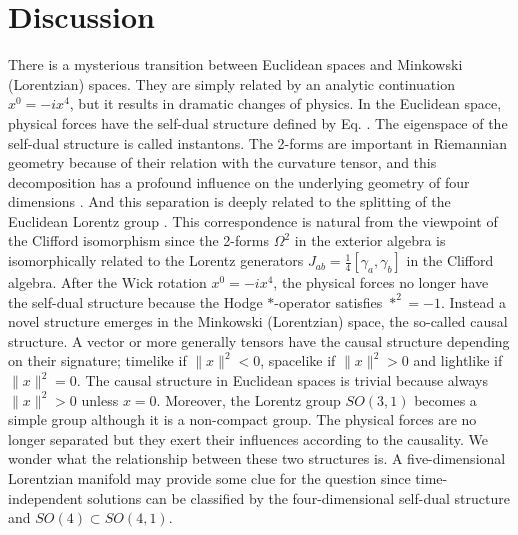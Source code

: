 \documentclass[12pt,epsf]{article}
\begin{document}
\section{Discussion}



There is a mysterious transition between Euclidean spaces and Minkowski (Lorentzian) spaces.
They are simply related by an analytic continuation $x^0 = - i x^4$, but it results in dramatic changes of physics.
In the Euclidean space, physical forces have the self-dual structure defined by Eq. .
The eigenspace of the self-dual structure is called instantons.
The 2-forms are important in Riemannian geometry because of their relation with the curvature tensor,
and this decomposition has a profound influence on the underlying geometry of four dimensions \cite{s-duality}.
And this separation is deeply related to the splitting of the Euclidean Lorentz group .
This correspondence is natural from the viewpoint of the Clifford isomorphism \cite{book-clifford} since
the 2-forms $\Omega^2$ in the exterior algebra is isomorphically related to the Lorentz generators
$J_{ab} = \frac{1}{4} [\gamma_a, \gamma_b]$ in the Clifford algebra.
After the Wick rotation $x^0 = - i x^4$, the physical forces no longer have the self-dual structure because
the Hodge $*$-operator satisfies $*^2 = - 1$.
Instead a novel structure emerges in the Minkowski (Lorentzian) space, the so-called causal structure.
A vector or more generally tensors have the causal structure depending on their signature;
timelike if $\|x\|^2 < 0$, spacelike if $\|x\|^2 > 0$ and lightlike if $\|x\|^2 =0$.
The causal structure in Euclidean spaces is trivial because always $\|x\|^2 > 0$
unless $x = 0$. Moreover, the Lorentz group $SO(3,1)$ becomes a simple group although it is a non-compact group.
The physical forces are no longer separated but they exert their influences according to the causality.
We wonder what the relationship between these two structures is.
A five-dimensional Lorentzian manifold may provide some clue for the question since time-independent solutions
can be classified by the four-dimensional self-dual structure and $SO(4) \subset SO(4,1)$.
\end{document}
